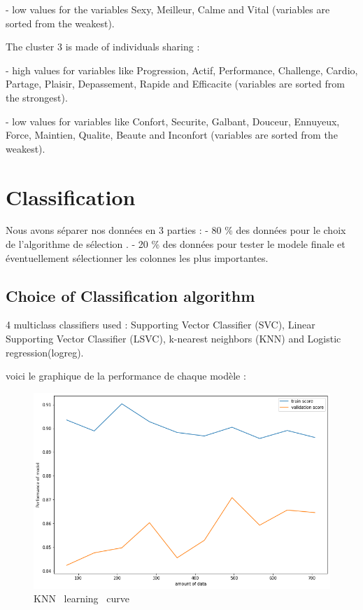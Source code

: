 \documentclass[12pt]{article}
\begin{document}
-	low values for the variables Sexy, Meilleur, Calme and Vital (variables are sorted from the weakest).


The cluster 3 is made of individuals sharing :


-	high values for variables like Progression, Actif, Performance, Challenge, Cardio, Partage, Plaisir, Depassement, Rapide and Efficacite (variables are sorted from the strongest).

-	low values for variables like Confort, Securite, Galbant, Douceur, Ennuyeux, Force, Maintien, Qualite, Beaute and Inconfort (variables are sorted from the weakest).


\newpage


\section{Classification}  %
 
 Nous avons séparer nos données en 3 parties :
- 80 \% des données pour le choix de l'algorithme de sélection .
- 20 \% des données pour tester le modele finale et éventuellement sélectionner les colonnes les plus importantes.

\subsection{Choice of Classification algorithm} 

 4 multiclass classifiers used : Supporting Vector Classifier
(SVC), Linear Supporting Vector Classifier
(LSVC), k-nearest neighbors 
(KNN) and  Logistic regression(logreg).

voici le graphique de la  performance de chaque modèle : 


\begin{figure}[H]
\begin{center}
\includegraphics[scale=0.6]{learning_curve_1.png} 
\caption[]{ KNN \ learning \ curve }
\end{center}
\end{figure}
\end{document}
